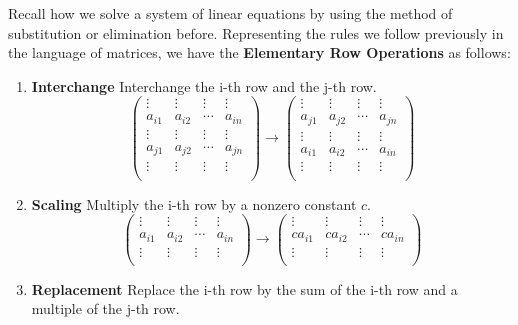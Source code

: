 \documentclass[10pt, a4paper]{article}
\begin{document}
\indent Recall how we solve a system of linear equations by using the method of substitution or elimination before. Representing the rules we follow previously in the language of matrices, we have the \textbf{Elementary Row Operations} as follows:
\begin{enumerate}
    \item \textbf{Interchange} Interchange the i-th row and the j-th row.\[
        \begin{pmatrix}
            \vdots & \vdots & \vdots & \vdots \\
            a_{i1} & a_{i2} & \cdots & a_{in} \\
            \vdots & \vdots & \vdots & \vdots \\
            a_{j1} & a_{j2} & \cdots & a_{jn} \\
            \vdots & \vdots & \vdots & \vdots \\
        \end{pmatrix}
        \rightarrow
        \begin{pmatrix}
            \vdots & \vdots & \vdots & \vdots \\
            a_{j1} & a_{j2} & \cdots & a_{jn} \\
            \vdots & \vdots & \vdots & \vdots \\
            a_{i1} & a_{i2} & \cdots & a_{in} \\
            \vdots & \vdots & \vdots & \vdots \\
        \end{pmatrix}
        \]
        \item \textbf{Scaling} Multiply the i-th row by a nonzero constant $c$.\[
        \begin{pmatrix}
            \vdots & \vdots & \vdots & \vdots \\
            a_{i1} & a_{i2} & \cdots & a_{in} \\
            \vdots & \vdots & \vdots & \vdots \\
        \end{pmatrix}
        \rightarrow
        \begin{pmatrix}
            \vdots & \vdots & \vdots & \vdots \\
            ca_{i1} & ca_{i2} & \cdots & ca_{in} \\
            \vdots & \vdots & \vdots & \vdots \\
        \end{pmatrix}
        \]
    \item \textbf{Replacement} Replace the i-th row by the sum of the i-th row and a multiple of the j-th row.\[
\]
\end{enumerate}
\end{document}
